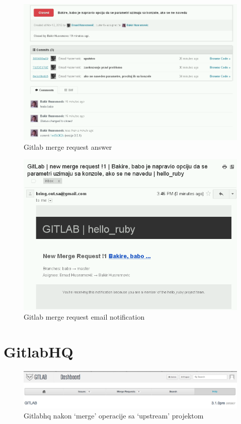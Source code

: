 \documentclass[times, utf8, seminar]{fit}
\begin{document}
\begin{figure}[H]
\centering
\includegraphics[width=15cm]{img/gitlab_merge_request_answer.png}
\caption{Gitlab merge request answer}
\end{figure}

\begin{figure}[H]
\centering
\includegraphics[width=15cm]{img/gitlab_merge_request_email_notification.png}
\caption{Gitlab merge request email notification}
\end{figure}


\section{GitlabHQ}

\begin{figure}[H]
\centering
\includegraphics[width=15cm]{img/gitlab_hernad_310_after_merge.png}
\caption{Gitlabhq nakon `merge' operacije sa `upstream' projektom}
\end{figure}
\end{document}
